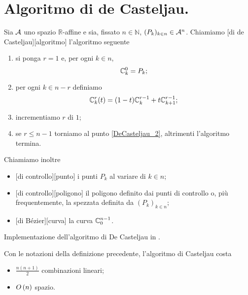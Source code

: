 \section{Algoritmo di de Casteljau.}
\label{MetodiNumericiPerLaGrafica_AlgoritmoDiDeCasteljau}
\begin{Definition}
  \label{Definition_DeCasteljau}
  Sia $\mathcal{A}$ uno spazio $\mathbb{R}$-affine e sia,
  fissato $n \in \mathbb{N}$,
  $(P_k)_{k \in n} \in \mathcal{A}^n$.
  Chiamiamo
  [di de Casteljau][algoritmo]
  l'algoritmo seguente
  \begin{enumerate}
    \item\label{DeCasteljau_1} si ponga $r = 1$ e, per ogni $k \in n$,
      \[
        \mathbb{C}_{k}^{0} = P_k;
      \]
    \item\label{DeCasteljau_2} per ogni $k \in n - r$ definiamo
      \[
        \mathbb{C}_{k}^{r}(t)
          = (1 - t)\mathbb{C}_{k}^{r - 1} + t\mathbb{C}_{k + 1}^{r - 1};
      \]
    \item\label{DeCasteljau_3} incrementiamo $r$ di $1$;
    \item\label{DeCasteljau_4} se $r \leq n - 1$ torniamo al punto
      \ref{DeCasteljau_2}, altrimenti l'algoritmo termina.
  \end{enumerate}
  Chiamiamo inoltre
  \begin{itemize}
    \item {}[di controllo][punto]
      i punti $P_k$ al variare di $k \in n$;
    \item {}[di controllo][poligono]
      il poligono definito dai punti di controllo o, pi\`u frequentemente,
      la spezzata definita da $(P_k)_{k \in n}$;
    \item {}[di B\'ezier][curva]
      la curva $\mathbb{C}_{0}^{n - 1}$.
  \end{itemize}
\end{Definition}
\begin{listing}
	\caption{Implementazione dell'algoritmo di De Casteljau in
  .}
\end{listing}
\begin{Theorem}
  Con le notazioni della definizione precedente, l'algoritmo di Casteljau costa
  \begin{itemize}
    \item $\frac{n(n + 1)}{2}$ combinazioni lineari;
    \item $O \left ( n \right )$ spazio.
  \end{itemize}
\end{Theorem}
